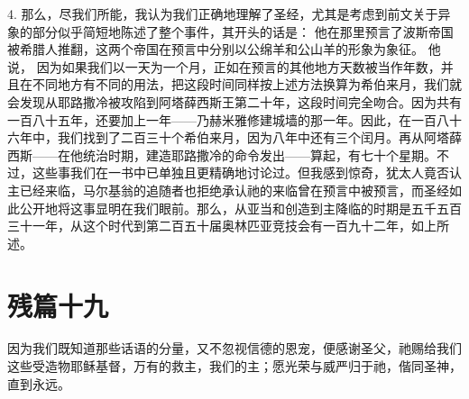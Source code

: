 4. 那么，尽我们所能，我认为我们正确地理解了圣经，尤其是考虑到前文关于异象的部分似乎简短地陈述了整个事件，其开头的话是： 他在那里预言了波斯帝国被希腊人推翻，这两个帝国在预言中分别以公绵羊和公山羊的形象为象征。 他说， 因为如果我们以一天为一个月，正如在预言的其他地方天数被当作年数，并且在不同地方有不同的用法，把这段时间同样按上述方法换算为希伯来月，我们就会发现从耶路撒冷被攻陷到阿塔薛西斯王第二十年，这段时间完全吻合。因为共有一百八十五年，还要加上一年——乃赫米雅修建城墙的那一年。因此，在一百八十六年中，我们找到了二百三十个希伯来月，因为八年中还有三个闰月。再从阿塔薛西斯——在他统治时期，建造耶路撒冷的命令发出——算起，有七十个星期。不过，这些事我们在一书中已单独且更精确地讨论过。但我感到惊奇，犹太人竟否认主已经来临，马尔基翁的追随者也拒绝承认祂的来临曾在预言中被预言，而圣经如此公开地将这事显明在我们眼前。那么，从亚当和创造到主降临的时期是五千五百三十一年，从这个时代到第二百五十届奥林匹亚竞技会有一百九十二年，如上所述。\par


\section{残篇十九}

因为我们既知道那些话语的分量，又不忽视信德的恩宠，便感谢圣父，祂赐给我们这些受造物耶稣基督，万有的救主，我们的主；愿光荣与威严归于祂，偕同圣神，直到永远。\par

